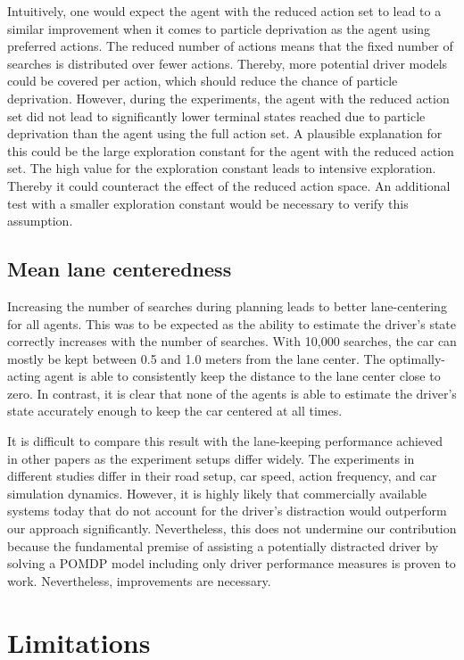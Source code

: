 Intuitively, one would expect the agent with the reduced action set to lead to a similar improvement when it comes to particle deprivation as the agent using preferred actions. The reduced number of actions means that the fixed number of searches is distributed over fewer actions. Thereby, more potential driver models could be covered per action, which should reduce the chance of particle deprivation. However, during the experiments, the agent with the reduced action set did not lead to significantly lower terminal states reached due to particle deprivation than the agent using the full action set. A plausible explanation for this could be the large exploration constant for the agent with the reduced action set. The high value for the exploration constant leads to intensive exploration. Thereby it could counteract the effect of the reduced action space. An additional test with a smaller exploration constant would be necessary to verify this assumption.

\subsection{Mean lane centeredness}

Increasing the number of searches during planning leads to better lane-centering for all agents. This was to be expected as the ability to estimate the driver's state correctly increases with the number of searches. With 10,000 searches, the car can mostly be kept between 0.5 and 1.0 meters from the lane center. The optimally-acting agent is able to consistently keep the distance to the lane center close to zero. In contrast, it is clear that none of the agents is able to estimate the driver's state accurately enough to keep the car centered at all times.

It is difficult to compare this result with the lane-keeping performance achieved in other papers as the experiment setups differ widely. The experiments in different studies differ in their road setup, car speed, action frequency, and car simulation dynamics. However, it is highly likely that commercially available systems today that do not account for the driver's distraction would outperform our approach significantly. Nevertheless, this does not undermine our contribution because the fundamental premise of assisting a potentially distracted driver by solving a POMDP model including only driver performance measures is proven to work. Nevertheless, improvements are necessary.

\section{Limitations}
\label{sec:limitations}

